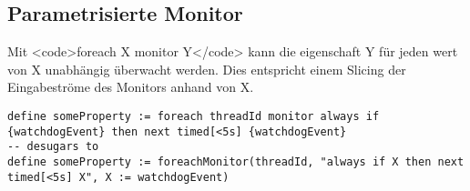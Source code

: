 \subsection{Parametrisierte Monitor}

Mit <code>foreach X monitor Y</code> kann die eigenschaft Y für jeden wert von X unabhängig überwacht werden. Dies entspricht einem Slicing der Eingabeströme des Monitors anhand von X.

\begin{lstlisting}
define someProperty := foreach threadId monitor always if {watchdogEvent} then next timed[<5s] {watchdogEvent}
-- desugars to
define someProperty := foreachMonitor(threadId, "always if X then next timed[<5s] X", X := watchdogEvent)
\end{lstlisting}